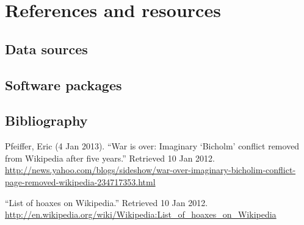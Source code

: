 \documentclass[10pt]{article}
\begin{document}
    \section{References and resources}
    
    \subsection{Data sources}
    
    \subsection{Software packages}
    
    \subsection{Bibliography}
    
    \begingroup
    \renewcommand{\section}[2]{}  %
    \begin{thebibliography}{1}
        
         Pfeiffer, Eric (4 Jan 2013). ``War is over: Imaginary `Bicholm' conflict removed from Wikipedia after five years.'' Retrieved 10 Jan 2012. \url{http://news.yahoo.com/blogs/sideshow/war-over-imaginary-bicholim-conflict-page-removed-wikipedia-234717353.html}
        
         ``List of hoaxes on Wikipedia.'' Retrieved 10 Jan 2012. \url{http://en.wikipedia.org/wiki/Wikipedia:List_of_hoaxes_on_Wikipedia}
        
    \end{thebibliography}
    \endgroup
    
\end{document}
